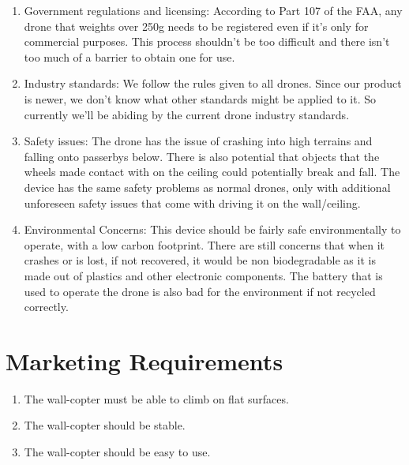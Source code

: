 \documentclass{article}
\begin{document}
\begin{enumerate}[label=\Alph*.]
\begin{enumerate}[label=\roman*.]
                \item Government regulations and licensing: According to Part 107 of the FAA, any drone that weights over 250g needs to be registered even if it's only for commercial purposes. This process shouldn't be too difficult and there isn't too much of a barrier to obtain one for use.
                \item Industry standards: We follow the rules given to all drones. Since our product is newer, we don't know what other standards might be applied to it. So currently we'll be abiding by the current drone industry standards.
                \item Safety issues: The drone has the issue of crashing into high terrains and falling onto passerbys below. There is also potential that objects that the wheels made contact with on the ceiling could potentially break and fall. The device has the same safety problems as normal drones, only with additional unforeseen safety issues that come with driving it on the wall/ceiling.
                \item Environmental Concerns: This device should be fairly safe environmentally to operate, with a low carbon footprint. There are still concerns that when it crashes or is lost, if not recovered, it would be non biodegradable as it is made out of plastics and other electronic components. The battery that is used to operate the drone is also bad for the environment if not recycled correctly.
            \end{enumerate}
        \end{enumerate}
    \newpage

    \section{Marketing Requirements}
        \begin{enumerate}[label=\arabic*.]
            \item The wall-copter must be able to climb on flat surfaces.
            \item The wall-copter should be stable.
            \item The wall-copter should be easy to use.
        \end{enumerate}
    
\end{document}
